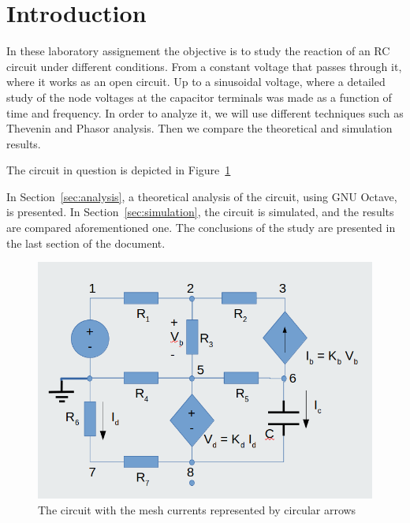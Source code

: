 \section{Introduction}
\label{sec:introduction}


\par In these laboratory assignement the objective is to study the reaction of an RC circuit under different conditions. From a constant voltage that passes through it, where it works as an open circuit. Up to a sinusoidal voltage, where a detailed study of the node voltages at the capacitor terminals was made as a function of time and frequency. In order to analyze it, we will use different techniques such as Thevenin and Phasor analysis. Then we compare the theoretical and simulation results.

\par The circuit in question is depicted in Figure~\ref{fig:circuit} 

\par In Section~\ref{sec:analysis}, a theoretical analysis of the circuit, using GNU Octave,  is presented. In Section~\ref{sec:simulation}, the circuit is simulated, and the results are compared 
aforementioned one. The conclusions of the study are presented in the last section of the document.


\begin{figure}
  \includegraphics[width=\linewidth]{circuit.png}
  \caption{The circuit with the mesh currents represented by circular arrows}
  \label{fig:circuit}
\end{figure}

